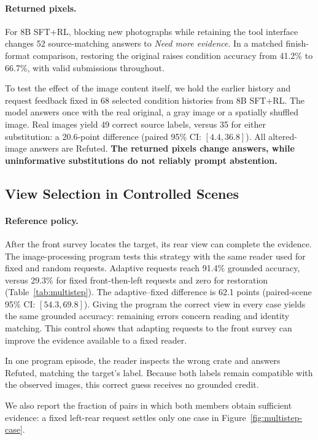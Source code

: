 \documentclass[10pt,twocolumn,letterpaper]{article}
\begin{document}
\paragraph{Returned pixels.}
For 8B SFT+RL, blocking new photographs while retaining the tool interface changes 52 source-matching answers to \emph{Need more evidence}.
In a matched finish-format comparison, restoring the original raises condition accuracy from 41.2\% to 66.7\%, with valid submissions throughout.

To test the effect of the image content itself, we hold the earlier history and request feedback fixed in 68 selected condition histories from 8B SFT+RL.
The model answers once with the real original, a gray image or a spatially shuffled image.
Real images yield 49 correct source labels, versus 35 for either substitution: a 20.6-point difference (paired 95\% CI: $[4.4,36.8]$).
All altered-image answers are Refuted.
\textbf{The returned pixels change answers, while uninformative substitutions do not reliably prompt abstention.}

\subsection{View Selection in Controlled Scenes}



\paragraph{Reference policy.}
After the front survey locates the target, its rear view can complete the evidence.
The image-processing program tests this strategy with the same reader used for fixed and random requests.
Adaptive requests reach 91.4\% grounded accuracy, versus 29.3\% for fixed front-then-left requests and zero for restoration (Table~\ref{tab:multistep}).
The adaptive--fixed difference is 62.1 points (paired-scene 95\% CI: $[54.3,69.8]$).
Giving the program the correct view in every case yields the same grounded accuracy: remaining errors concern reading and identity matching.
This control shows that adapting requests to the front survey can improve the evidence available to a fixed reader.

In one program episode, the reader inspects the wrong crate and answers Refuted, matching the target's label.
Because both labels remain compatible with the observed images, this correct guess receives no grounded credit.

We also report the fraction of pairs in which both members obtain sufficient evidence: a fixed left-rear request settles only one case in Figure~\ref{fig:multistep-case}.
\end{document}
